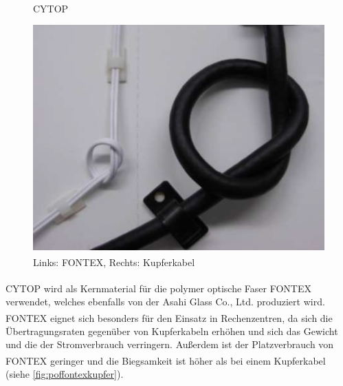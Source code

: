 \begin{figure}[H]
    \begin{center}
        \begin{minipage}{0.4\textwidth}
            \begin{center}
                \footnotesize


                \caption{CYTOP\textsuperscript{\texttrademark}}
                \label{rec:cytop}
            \end{center}
        \end{minipage}
        \hspace{0.025\textwidth}
        \begin{minipage}{0.4\textwidth}
            \begin{center}
                \includegraphics[height=0.1275\textheight]{Bilder/Optische_Wellenleiter_Die_Polymer_Optische_Faser/Cytop/poffontexkupfer.png}
                \caption[Links: FONTEX\textsuperscript{\texttrademark}, Rechts: Kupferkabel\newline              \url{www.lucina.jp/eg_fontex/pdf/Tecnhical.pdf} S.10 (zuletzt aufgerufen am 19.09.2015)]{Links: FONTEX\textsuperscript{\texttrademark}, Rechts: Kupferkabel}
                \label{fig:poffontexkupfer}
            \end{center}
        \end{minipage}
    \end{center}
\end{figure}

CYTOP\textsuperscript{\texttrademark} wird als Kernmaterial für die polymer
optische Faser FONTEX\textsuperscript{\texttrademark} verwendet, welches
ebenfalls von der Asahi Glass Co., Ltd. produziert wird.
FONTEX\textsuperscript{\texttrademark} eignet sich besonders für den Einsatz in
Rechenzentren, da sich die Übertragungsraten gegenüber von Kupferkabeln erhöhen
und sich das Gewicht und die der Stromverbrauch verringern. Außerdem ist der
Platzverbrauch von FONTEX\textsuperscript{\texttrademark} geringer und die
Biegsamkeit ist höher als bei einem Kupferkabel (siehe
\autoref{fig:poffontexkupfer}). \cite{poffontex}
